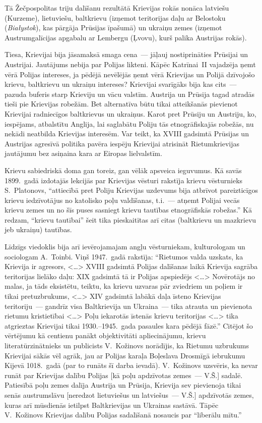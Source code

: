 \documentclass[twoside,a5paper,12pt,fleqn,openany]{extbook}
\newcommand{\pltxti}[1]{\textit{\textpolish{#1}}}
\newcommand{\citespace}{<\dots{}>}
\begin{document}
Tā Žečpospolitas triju dalīšanu rezultātā Krievijas rokās nonāca latviešu (Kurzeme), lietuviešu, baltkrievu (izņemot teritorijas daļu ar Belostoku (\pltxti{Białystok}), kas pārgāja Prūsijas īpašumā) un ukraiņu zemes (izņemot Austrumgalīcijas apgabalu ar Lembergu (Ļvovu), kurš palika Austrijas rokās).

Tiesa, Krievijai bija jāsamaksā smaga cena~--- jāļauj nostiprināties Prūsijai un Austrijai. Jautājums nebija par Polijas likteni. Kāpēc Katrīnai~II vajadzēja ņemt vērā Polijas intereses, ja pēdējā nevēlējās ņemt vērā Krievijas un Polijā dzīvojošo krievu, baltkrievu un ukraiņu intereses? Krievijai svarīgāks bija kas cits~--- pazuda buferis starp Krieviju un vācu valstīm. Austrija un Prūsija tagad atradās tieši pie Krievijas robežām. Bet alternatīva būtu tikai atteikšanās pievienot Krievijai radniecīgos baltkrievus un ukraiņus. Karot pret Prūsiju un Austriju, ko, iespējams, atbalstītu Anglija, lai saglabātu Poliju tās etnogrāfiskajās robežās, nu nekādi neatbilda Krievijas interesēm. Var teikt, ka XVIII gadsimtā Prūsijas un Austrijas agresīvā politika pavēra iespēju Krievijai atrisināt Rietumkrievijas jautājumu bez asiņaina kara ar Eiropas lielvalstīm.

Krievu sabiedriskā doma gan toreiz, gan vēlāk apsveica ieguvumus. Kā savās 1899.~gadā izdotajās lekcijās par Krievijas vēsturi rakstīja krievu vēsturnieks S.~Platonovs, ``attiecībā pret Poliju Krievijas uzdevums bija atbrīvot pareizticīgos krievu iedzīvotājus no katolisko poļu valdīšanas, t.i.~--- atņemt Polijai vecās krievu zemes un no šīs puses sasniegt krievu tautības etnogrāfiskās robežas.'' Kā redzam, ``krievu tautībai'' šeit tika pieskaitītas arī citas (baltkrievu un mazkrievu jeb ukraiņu) tautības.

Līdzīgs viedoklis bija arī ievērojamajam angļu vēsturniekam, kulturologam un sociologam A.~Toinbi. Viņš 1947.~gadā rakstīja: ``Rietumos valda uzskats, ka Krievija ir agresors, \citespace{} XVIII gadsimtā Polijas dalīšanas laikā Krievija sagrāba teritorijas lielāko daļu: XIX gadsimtā tā ir Polijas apspiedējs \citespace{} Novērotājs no malas, ja tāds eksistētu, teiktu, ka krievu uzvaras pār zviedriem un poļiem ir tikai pretuzbrukums, \citespace{} XIV gadsimtā labākā daļa īsteno Krievijas teritoriju~--- gandrīz visa Baltkrievija un Ukraina~--- tika atrauta un pievienota rietumu kristietībai \citespace{} Poļu iekarotās īstenās krievu teritorijas \citespace{} tika atgrieztas Krievijai tikai 1930.--1945.~gada pasaules kara pēdējā fāzē.'' Citējot šo vērtējumu kā centienu panākt objektivitāti apliecinājumu, krievu literatūrzinātnieks un publicists V.~Kožinovs norādījis, ka Rietumu uzbrukums Krievijai sākās vēl agrāk, jau ar Polijas karaļa Boļeslava Drosmīgā iebrukumu Kijevā 1018.~gadā (par to runāts šī darba ievadā). V.~Kožinovs uzsvēris, ka nevar runāt par Krievijas dalību Polijas [kā poļu apdzīvotas zemes~--- V.Š.] sadalē. Patiesībā poļu zemes dalīja Austrija un Prūsija, Krievija sev pievienoja tikai senās austrumslāvu [neredzot lietuviešus un latviešus~--- V.Š.] apdzīvotās zemes, kuras arī mūsdienās ietilpst Baltkrievijas un Ukrainas sastāvā. Tāpēc V.~Kožinovs Krievijas dalību Polijas sadalīšanā nosaucis par ``liberālu mītu.''
\end{document}
